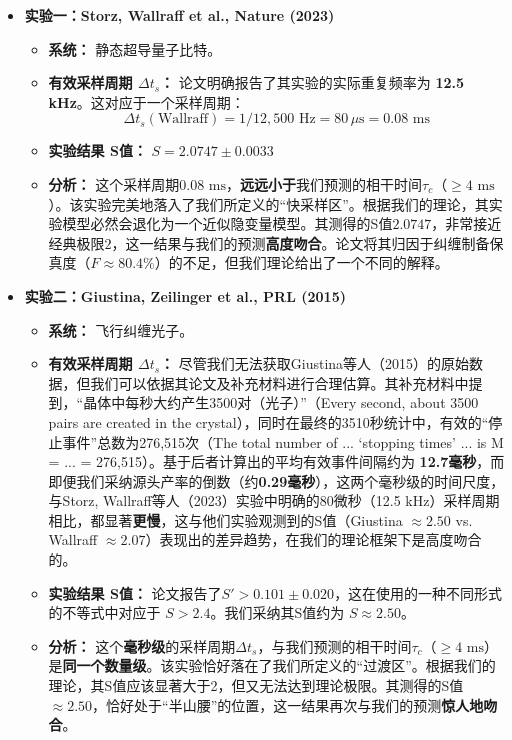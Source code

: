 \documentclass[12pt]{article}
\begin{document}
\begin{itemize}
    \item \textbf{实验一：Storz, Wallraff et al., Nature (2023)}
    \begin{itemize}
        \item \textbf{系统：} 静态超导量子比特。
        \item \textbf{有效采样周期 $\Delta t_s$：} 论文明确报告了其实验的实际重复频率为 \textbf{12.5 kHz}。这对应于一个采样周期：
        \[ \Delta t_s(\text{Wallraff}) = 1 / 12,500 \text{ Hz} = 80 \, \mu\text{s} = 0.08 \text{ ms} \]
        \item \textbf{实验结果 S值：} $S = 2.0747 \pm 0.0033$
        \item \textbf{分析：} 这个采样周期$0.08 \text{ ms}$，\textbf{远远小于}我们预测的相干时间$\tau_c$（$\geq 4 \text{ ms}$）。该实验完美地落入了我们所定义的``快采样区''。根据我们的理论，其实验模型必然会退化为一个近似隐变量模型。其测得的S值$2.0747$，非常接近经典极限$2$，这一结果与我们的预测\textbf{高度吻合}。论文将其归因于纠缠制备保真度（$F\approx80.4\%$）的不足，但我们理论给出了一个不同的解释。
    \end{itemize}

    \item \textbf{实验二：Giustina, Zeilinger et al., PRL (2015)}
    \begin{itemize}
        \item \textbf{系统：} 飞行纠缠光子。
        \item \textbf{有效采样周期 $\Delta t_s$：} 尽管我们无法获取Giustina等人（2015）的原始数据，但我们可以依据其论文及补充材料进行合理估算。其补充材料中提到，``晶体中每秒大约产生3500对（光子）''（Every second, about 3500 pairs are created in the crystal），同时在最终的3510秒统计中，有效的``停止事件''总数为276,515次（The total number of ... `stopping times' ... is M = ... = 276,515）。基于后者计算出的平均有效事件间隔约为 \textbf{12.7毫秒}，而即便我们采纳源头产率的倒数（约\textbf{0.29毫秒}），这两个毫秒级的时间尺度，与Storz, Wallraff等人（2023）实验中明确的80微秒（12.5 kHz）采样周期相比，都显著\textbf{更慢}，这与他们实验观测到的S值（Giustina $\approx2.50$ vs. Wallraff $\approx2.07$）表现出的差异趋势，在我们的理论框架下是高度吻合的。
        \item \textbf{实验结果 S值：} 论文报告了$S' > 0.101 \pm 0.020$，这在使用的一种不同形式的不等式中对应于 $S > 2.4$。我们采纳其S值约为 \textbf{$S \approx 2.50$}。
        \item \textbf{分析：} 这个\textbf{毫秒级}的采样周期$\Delta t_s$，与我们预测的相干时间$\tau_c$（$\geq 4 \text{ ms}$）是\textbf{同一个数量级}。该实验恰好落在了我们所定义的``过渡区''。根据我们的理论，其S值应该显著大于2，但又无法达到理论极限。其测得的S值$\approx 2.50$，恰好处于``半山腰''的位置，这一结果再次与我们的预测\textbf{惊人地吻合}。
    \end{itemize}
\end{itemize}
\end{document}
